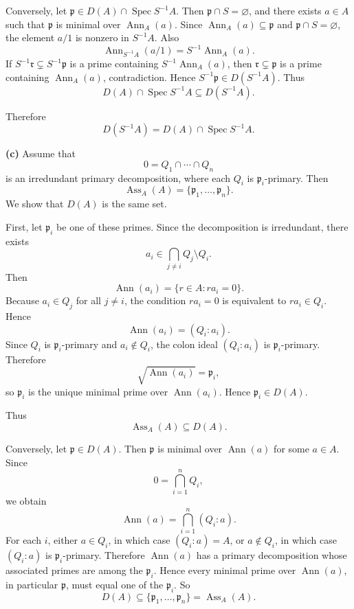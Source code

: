 \documentclass[12pt,a4paper]{article}
\theoremstyle{plain}
\theoremstyle{definition}      %
\begin{document}
	Conversely, let \(\mathfrak p\in D(A)\cap \operatorname{Spec} S^{-1}A\). Then \(\mathfrak p\cap S=\varnothing\), and there exists \(a\in A\) such that \(\mathfrak p\) is minimal over \(\operatorname{Ann}_A(a)\). Since \(\operatorname{Ann}_A(a)\subseteq \mathfrak p\) and \(\mathfrak p\cap S=\varnothing\), the element \(a/1\) is nonzero in \(S^{-1}A\). Also
	\[
	\operatorname{Ann}_{S^{-1}A}(a/1)=S^{-1}\operatorname{Ann}_A(a).
	\]
	If \(S^{-1}\mathfrak r\subsetneq S^{-1}\mathfrak p\) is a prime containing \(S^{-1}\operatorname{Ann}_A(a)\), then \(\mathfrak r\subsetneq \mathfrak p\) is a prime containing \(\operatorname{Ann}_A(a)\), contradiction. Hence \(S^{-1}\mathfrak p\in D(S^{-1}A)\). Thus
	\[
	D(A)\cap \operatorname{Spec} S^{-1}A \subseteq D(S^{-1}A).
	\]
	
	Therefore
	\[
	D(S^{-1}A)=D(A)\cap \operatorname{Spec} S^{-1}A.
	\]
	
	\medskip
	
	\textbf{(c)} Assume that
	\[
	0=Q_1\cap \cdots \cap Q_n
	\]
	is an irredundant primary decomposition, where each \(Q_i\) is \(\mathfrak p_i\)-primary. Then
	\[
	\operatorname{Ass}_A(A)=\{\mathfrak p_1,\dots,\mathfrak p_n\}.
	\]
	We show that \(D(A)\) is the same set.
	
	First, let \(\mathfrak p_i\) be one of these primes. Since the decomposition is irredundant, there exists
	\[
	a_i\in \bigcap_{j\ne i}Q_j \setminus Q_i.
	\]
	Then
	\[
	\operatorname{Ann}(a_i)=\{r\in A:ra_i=0\}.
	\]
	Because \(a_i\in Q_j\) for all \(j\ne i\), the condition \(ra_i=0\) is equivalent to \(ra_i\in Q_i\). Hence
	\[
	\operatorname{Ann}(a_i)=(Q_i:a_i).
	\]
	Since \(Q_i\) is \(\mathfrak p_i\)-primary and \(a_i\notin Q_i\), the colon ideal \((Q_i:a_i)\) is \(\mathfrak p_i\)-primary. Therefore
	\[
	\sqrt{\operatorname{Ann}(a_i)}=\mathfrak p_i,
	\]
	so \(\mathfrak p_i\) is the unique minimal prime over \(\operatorname{Ann}(a_i)\). Hence \(\mathfrak p_i\in D(A)\).
	
	Thus
	\[
	\operatorname{Ass}_A(A)\subseteq D(A).
	\]
	
	Conversely, let \(\mathfrak p\in D(A)\). Then \(\mathfrak p\) is minimal over \(\operatorname{Ann}(a)\) for some \(a\in A\). Since
	\[
	0=\bigcap_{i=1}^n Q_i,
	\]
	we obtain
	\[
	\operatorname{Ann}(a)=\bigcap_{i=1}^n (Q_i:a).
	\]
	For each \(i\), either \(a\in Q_i\), in which case \((Q_i:a)=A\), or \(a\notin Q_i\), in which case \((Q_i:a)\) is \(\mathfrak p_i\)-primary. Therefore \(\operatorname{Ann}(a)\) has a primary decomposition whose associated primes are among the \(\mathfrak p_i\). Hence every minimal prime over \(\operatorname{Ann}(a)\), in particular \(\mathfrak p\), must equal one of the \(\mathfrak p_i\). So
	\[
	D(A)\subseteq \{\mathfrak p_1,\dots,\mathfrak p_n\}=\operatorname{Ass}_A(A).
	\]
	
\end{document}
